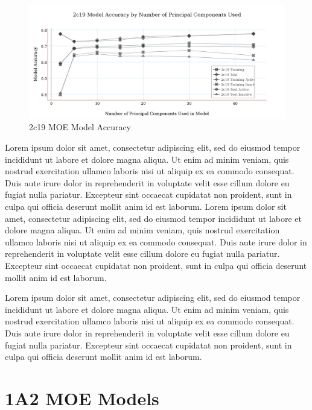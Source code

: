 \begin{figure}[!h]
\includegraphics[width=1\textwidth]{../img/2c19_moe_model_accuracy.png}
\caption{2c19 MOE Model Accuracy}
\end{figure}

Lorem ipsum dolor sit amet, consectetur adipiscing elit, sed do eiusmod tempor incididunt ut labore et dolore magna aliqua. Ut enim ad minim veniam, quis nostrud exercitation ullamco laboris nisi ut aliquip ex ea commodo consequat. Duis aute irure dolor in reprehenderit in voluptate velit esse cillum dolore eu fugiat nulla pariatur. Excepteur sint occaecat cupidatat non proident, sunt in culpa qui officia deserunt mollit anim id est laborum. Lorem ipsum dolor sit amet, consectetur adipiscing elit, sed do eiusmod tempor incididunt ut labore et dolore magna aliqua. Ut enim ad minim veniam, quis nostrud exercitation ullamco laboris nisi ut aliquip ex ea commodo consequat. Duis aute irure dolor in reprehenderit in voluptate velit esse cillum dolore eu fugiat nulla pariatur. Excepteur sint occaecat cupidatat non proident, sunt in culpa qui officia deserunt mollit anim id est laborum.

Lorem ipsum dolor sit amet, consectetur adipiscing elit, sed do eiusmod tempor incididunt ut labore et dolore magna aliqua. Ut enim ad minim veniam, quis nostrud exercitation ullamco laboris nisi ut aliquip ex ea commodo consequat. Duis aute irure dolor in reprehenderit in voluptate velit esse cillum dolore eu fugiat nulla pariatur. Excepteur sint occaecat cupidatat non proident, sunt in culpa qui officia deserunt mollit anim id est laborum.

\section{1A2 MOE Models}

